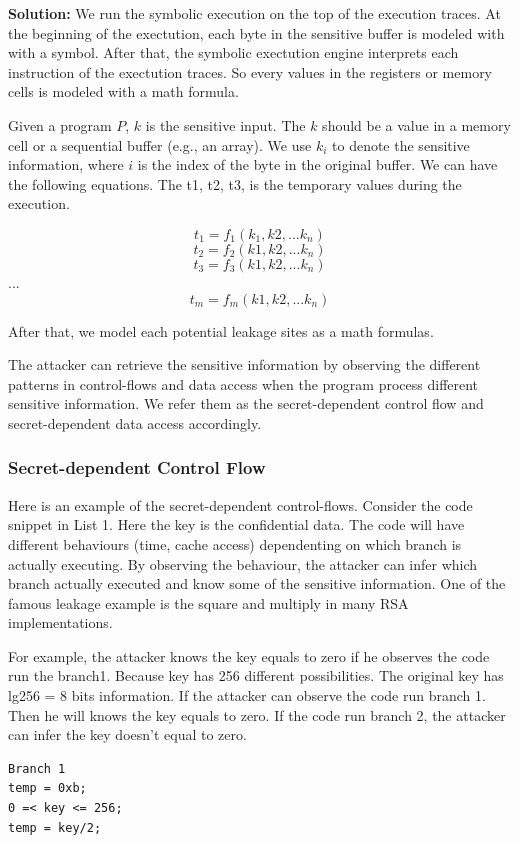 \textbf{Solution: }
We run the symbolic execution on the top of the execution traces.
At the beginning of the exectution,
each byte in the sensitive buffer is modeled with with a symbol. After that, the symbolic
exectution engine interprets each instruction of the exectution traces. So every values in the
registers or memory cells is modeled with a math formula.

Given a program $P$, $k$ is the sensitive input. The $k$ should be a value in a memory cell or a sequential 
buffer (e.g., an array). We use $k_i$ to denote the sensitive information, where $i$ is the index of the byte in
the original buffer. We can have the following equations. The t1, t2, t3, is the temporary values during the execution.

$$t_1 = f_1(k_1, k2, ... k_n)$$
$$t_2 = f_2(k1, k2, ... k_n)$$
$$t_3 = f_3(k1, k2, ... k_n)$$
$...$
$$t_m = f_m(k1, k2, ... k_n)$$

After that, we model each potential leakage sites as a math formulas.

The attacker can retrieve the sensitive information by observing the different patterns in 
control-flows and data access when the program process different sensitive information. 
We refer them as the secret-dependent control flow and secret-dependent data access accordingly.


\subsubsection{Secret-dependent Control Flow}
Here is an example of the secret-dependent control-flows. Consider the code snippet in List 1. 
Here the key is the confidential data. The code will have different behaviours (time, cache access) 
dependenting on which branch is actually executing. By observing the behaviour, 
the attacker can infer which branch actually executed and know some of the sensitive information. 
One of the famous leakage example is the square and multiply in many RSA implementations. 

For example, the attacker knows the key equals to zero if he observes the code run the branch1. 
Because key has 256 different possibilities. The original key has lg256 = 8 bits information. 
If the attacker can observe the code run branch 1. Then he will knows the key equals to zero. 
If the code run branch 2, the attacker can infer the key doesn’t equal to zero. 

\begin{lstlisting}
Branch 1
temp = 0xb;
0 =< key <= 256;
temp = key/2;
\end{lstlisting}

